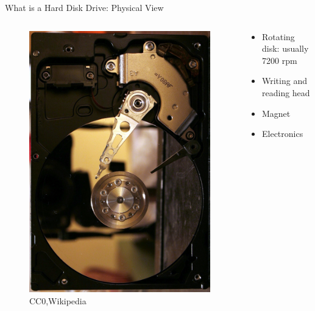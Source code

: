 \documentclass[12pt]{beamer}
\newlength{\wideitemsep}
\let\olditem\item
\renewcommand{\item}{\setlength{\itemsep}{\wideitemsep}\olditem}
\begin{document}
\begin{frame}[fragile]{What is a Hard Disk Drive: Physical View}
 \begin{columns}[c]
   	\begin{column}[c]{.4\textwidth}
   		\begin{figure}[p]
   			\centering
   			\includegraphics[width=\linewidth]{img/hdd_open.jpg}
   			\caption{CC0,Wikipedia}
   		\end{figure}
   	\end{column}
   	\begin{column}[c]{.6\textwidth}
   		\begin{itemize}
   			\item Rotating disk: usually 7200 rpm
   			\item Writing and reading head
   			\item Magnet
   			\item Electronics
   		\end{itemize}
   	\end{column}
 \end{columns}
\end{frame}
\end{document}
